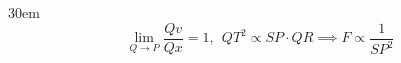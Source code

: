 \documentclass[border=4pt]{standalone}
\begin{document}
\begin{varwidth}{30em}
\large
\[ \lim_{Q\to P}\frac{Qv}{Qx}=1,\ \ QT^2 \propto SP\cdot QR \implies F \propto \dfrac{1}{SP^2} \]

\end{varwidth}
\end{document}
